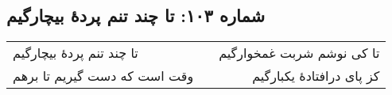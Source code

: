 \begin{center}
\section*{شماره ۱۰۳: تا چند تنم پردۀ بیچارگیم}
\label{sec:103}
\begin{longtable}{l p{0.5cm} r}
تا چند تنم پردهٔ بیچارگیم
&&
تا کی نوشم شربت غمخوارگیم
\\
وقت است که دست گیریم تا برهم
&&
کز پای درافتادهٔ یکبارگیم
\\
\end{longtable}
\end{center}
